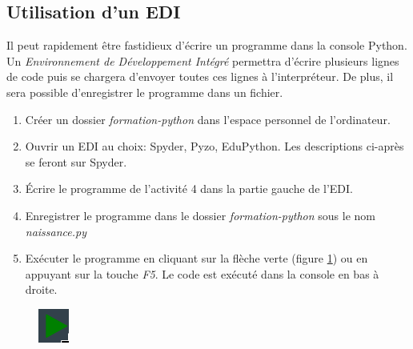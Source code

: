 \documentclass[a4paper,11pt]{article}
\begin{document}
\begin{Form}
\subsection{Utilisation d'un EDI}
Il peut rapidement être fastidieux d'écrire un programme dans la console Python. Un \emph{Environnement de Développement Intégré} permettra d'écrire plusieurs lignes de code puis se chargera d'envoyer toutes ces lignes à l'interpréteur. De plus, il sera possible d'enregistrer le programme dans un fichier.
\begin{activite}
\begin{enumerate}
\item Créer un dossier \emph{formation-python} dans l'espace personnel de l'ordinateur.
\item Ouvrir un EDI au choix: Spyder, Pyzo, EduPython. Les descriptions ci-après se feront sur Spyder.
\item Écrire le programme de l'activité 4 dans la partie gauche de l'EDI.
\item Enregistrer le programme dans le dossier \emph{formation-python} sous le nom \emph{naissance.py}
\item Exécuter le programme en cliquant sur la flèche verte (figure \ref{execution}) ou en appuyant sur la touche \emph{F5}. Le code est exécuté dans la console en bas à droite.
\end{enumerate}
\end{activite}
\begin{figure}[!h]
\centering
\includegraphics[width=1cm]{ressources/execution.png}
\label{execution}
\end{figure}

\end{Form}
\end{document}
